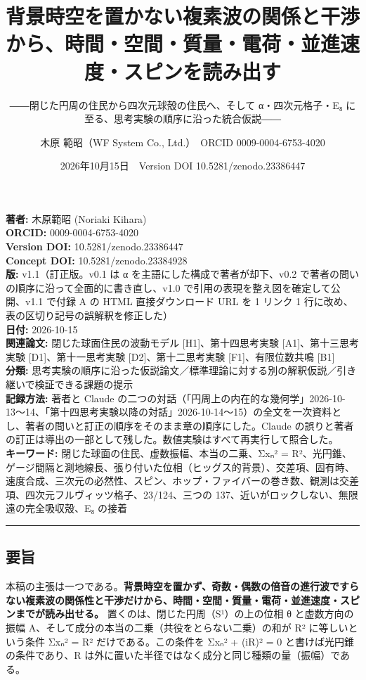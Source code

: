 \documentclass[
  a4paper,
]{ltjsarticle}
\title{背景時空を置かない複素波の関係と干渉から、時間・空間・質量・電荷・並進速度・スピンを読み出す}
\subtitle{――閉じた円周の住民から四次元球殻の住民へ、そして
α・四次元格子・E₈ に至る、思考実験の順序に沿った統合仮説――}
\author{木原 範昭（WF System Co., Ltd.）　ORCID 0009-0004-6753-4020}
\date{2026年10月15日　Version DOI 10.5281/zenodo.23386447}
\begin{document}
\maketitle

\textbf{著者:} 木原範昭 (Noriaki Kihara)\\
\textbf{ORCID:} 0009-0004-6753-4020\\
\textbf{Version DOI:} 10.5281/zenodo.23386447\\
\textbf{Concept DOI:} 10.5281/zenodo.23384928\\
\textbf{版:} v1.1（訂正版。v0.1 は α を主語にした構成で著者が却下、v0.2
で著者の問いの順序に沿って全面的に書き直し、v1.0
で引用の表現を整え図を確定して公開、v1.1 で付録 A の HTML
直接ダウンロード URL を 1 リンク 1
行に改め、表の区切り記号の誤解釈を修正した）\\
\textbf{日付:} 2026-10-15\\
\textbf{関連論文:} 閉じた球面住民の波動モデル {[}H1{]}、第十四思考実験
{[}A1{]}、第十三思考実験 {[}D1{]}、第十一思考実験
{[}D2{]}、第十二思考実験 {[}F1{]}、有限位数共鳴 {[}B1{]}\\
\textbf{分類:}
思考実験の順序に沿った仮説論文／標準理論に対する別の解釈仮説／引き継いで検証できる課題の提示\\
\textbf{記録方法:} 著者と Claude
の二つの対話（「円周上の内在的な幾何学」2026-10-13〜14、「第十四思考実験以降の対話」2026-10-14〜15）の全文を一次資料とし、著者の問いと訂正の順序をそのまま章の順序にした。Claude
の誤りと著者の訂正は導出の一部として残した。数値実験はすべて再実行して照合した。\\
\textbf{キーワード:} 閉じた球面の住民、虚数振幅、本当の二乗、Σxₙ² =
R²、光円錐、ゲージ間隔と測地線長、張り付いた位相（ヒッグス的背景）、交差項、固有時、速度合成、三次元の必然性、スピン、ホップ・ファイバーの巻き数、観測は交差項、四次元フルヴィッツ格子、23/124、三つの
137、近いがロックしない、無限遠の完全吸収殻、E₈ の接着

\begin{center}\rule{0.5\linewidth}{0.5pt}\end{center}

\subsection{要旨}\label{ux8981ux65e8}

本稿の主張は一つである。\textbf{背景時空を置かず、奇数・偶数の倍音の進行波ですらない複素波の関係性と干渉だけから、時間・空間・質量・電荷・並進速度・スピンまでが読み出せる。}
置くのは、閉じた円周（S¹）の上の位相 θ と虚数方向の振幅
A、そして成分の本当の二乗（共役をとらない二乗）の和が R²
に等しいという条件 Σxₙ² = R² だけである。この条件を Σxₙ² + (iR)² = 0
と書けば光円錐の条件であり、R
は外に置いた半径ではなく成分と同じ種類の量（振幅）である。
\end{document}
